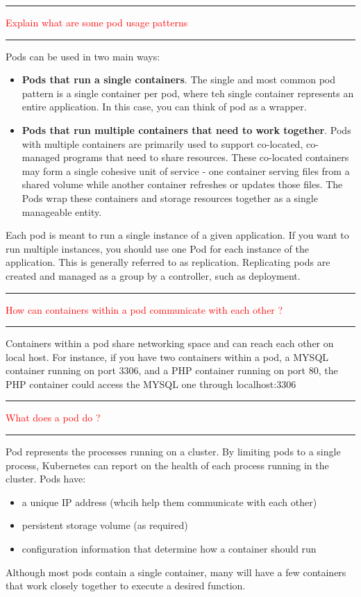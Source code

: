 \documentclass{article}
\begin{document}
\noindent
{\color{red} \rule{\linewidth}{0.5mm}}
\textcolor{red}{Explain what are some pod usage patterns} \\
\noindent
{\color{red} \rule{\linewidth}{0.5mm}}
Pods can be used in two main ways:
\begin{itemize}
    \item \textbf{ Pods that run a single containers}. The single and most common pod pattern is a single container per pod, where teh single container represents an entire application. In this case, you can think of pod as a wrapper.
    \item \textbf{ Pods that run multiple containers that need to work together}. Pods with multiple containers are primarily used to support co-located, co-managed programs that need to share resources. These co-located containers may form a single cohesive unit of service - one container serving files from a shared volume while another container refreshes or updates those files. The Pods wrap these containers and storage resources together as a single manageable entity. 
\end{itemize}
Each pod is meant to run a single instance of a given application. If you want to run multiple instances, you should use one Pod for each instance of the application. This is generally referred to as replication. Replicating pods are created and managed as a group by a controller, such as deployment. 

\noindent
{\color{red} \rule{\linewidth}{0.5mm}}
\textcolor{red}{How can containers within a pod communicate with each other ?} \\
\noindent
{\color{red} \rule{\linewidth}{0.5mm}}
Containers within a pod share networking space and can reach each other on local host. For instance, if you have two containers within a pod, a MYSQL container running on port 3306, and a PHP container running on port 80, the PHP container could access the MYSQL one through localhost:3306  \\
\noindent
{\color{red} \rule{\linewidth}{0.5mm}}
\textcolor{red}{What does a pod do ?} \\
\noindent
{\color{red} \rule{\linewidth}{0.5mm}}
Pod represents the processes running on a cluster. By limiting pods to a single process, Kubernetes can report on the health of each process running in the cluster. Pods have:
\begin{itemize}
    \item a unique IP address (whcih help them communicate with each other)
    \item persistent storage volume (as required)
    \item configuration information that determine how a container should run
\end{itemize}
Although most pods contain a single container, many will have a few containers that work closely together to execute a desired function.
\\
\newpage
\end{document}
